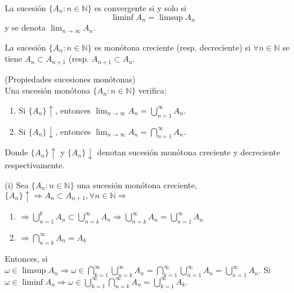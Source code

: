 \begin{defn}
La sucesión $\{A_n: n\in\mathbb{N}\}$ es convergente si y solo si \[\liminf A_n = \limsup A_n\] y se denota $\lim_{n\rightarrow\infty} A_n$.
\end{defn}

\begin{defn}
La sucesión $\{A_n: n\in\mathbb{N}\}$ es monótona creciente (resp. decreciente) si $\forall n\in\mathbb{N}$ se tiene $A_n \subset A_{n+1}$ (resp. $A_{n+1} \subset A_{n}$.
\end{defn}

\begin{prop}(Propiedades sucesiones monótonas)\\
Una sucesión monótona $\{A_n: n\in\mathbb{N}\}$ verifica:

\begin{enumerate}[label=(\roman*)]
    \item Si $\{A_n\}\uparrow$, entonces $\lim_{n\rightarrow\infty} A_n =  \bigcup_{n=1}^\infty A_n$.
    \item Si $\{A_n\}\downarrow$, entonces $\lim_{n\rightarrow\infty} A_n =  \bigcap_{n=1}^\infty A_n$.
\end{enumerate}
Donde $\{A_n\}\uparrow$ y $\{A_n\}\downarrow$ denotan sucesión monótona creciente y decreciente respectivamente.
\end{prop}

\begin{dem}(i) Sea $\{A_n: n\in\mathbb{N}\}$ una sucesión monótona creciente,
    $\{A_n\}\uparrow \Rightarrow A_n \subset A_{n+1}, \forall n\in\mathbb{N} \Rightarrow$
    \begin{enumerate}[label=(\roman*)]
        \item  $\Rightarrow \bigcup_{n=1}^k A_n \subset \bigcup_{n=k}^\infty A_n \Rightarrow \bigcup_{n=k}^\infty A_n = \bigcup_{n=1}^\infty A_n$
        \item $\Rightarrow \bigcap_{n=k}^\infty A_n = A_k$
    \end{enumerate}
    Entonces, si $\omega\in\limsup A_n \Rightarrow \omega \in \bigcap_{k=1}^\infty \bigcup_{n=k}^\infty A_n = \bigcap_{k=1}^\infty \bigcup_{n=1}^\infty A_n = \bigcup_{n=1}^\infty A_n.$ Si $\omega\in\liminf A_n \Rightarrow \omega \in \bigcup_{k=1}^\infty \bigcap_{n=k}^\infty A_n = \bigcup_{k=1}^\infty A_k.$
\end{dem}


